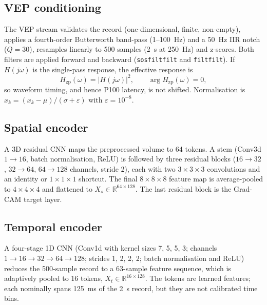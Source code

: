 \documentclass{ieeeaccessapprox}
\begin{document}
\subsection{VEP conditioning}\label{sec:vep}
The VEP stream validates the record (one-dimensional, finite, non-empty), applies a fourth-order Butterworth band-pass (1--100~Hz) and a 50~Hz IIR notch ($Q=30$), resamples linearly to 500 samples (2~s at 250~Hz) and z-scores. Both filters are applied forward and backward (\texttt{sosfiltfilt} and \texttt{filtfilt}). If $H(j\omega)$ is the single-pass response, the effective response is
\begin{equation}
H_{\mathrm{zp}}(\omega)=\lvert H(j\omega)\rvert^{2},\qquad \arg H_{\mathrm{zp}}(\omega)=0,
\label{eq:zp}
\end{equation}
so waveform timing, and hence P100 latency, is not shifted. Normalisation is $\hat{x}_k=(x_k-\mu)/(\sigma+\varepsilon)$ with $\varepsilon=10^{-8}$.

\subsection{Spatial encoder}
A 3D residual CNN maps the preprocessed volume to 64 tokens. A stem (Conv3d $1\!\to\!16$, batch normalisation, ReLU) is followed by three residual blocks ($16\!\to\!32$, $32\!\to\!64$, $64\!\to\!128$ channels, stride 2), each with two $3\!\times\!3\!\times\!3$ convolutions and an identity or $1\!\times\!1\!\times\!1$ shortcut. The final $8\!\times\!8\!\times\!8$ feature map is average-pooled to $4\!\times\!4\!\times\!4$ and flattened to $X_s\in\mathbb{R}^{64\times128}$. The last residual block is the Grad-CAM target layer.

\subsection{Temporal encoder}
A four-stage 1D CNN (Conv1d with kernel sizes 7, 5, 5, 3; channels $1\!\to\!16\!\to\!32\!\to\!64\!\to\!128$; strides 1, 2, 2, 2; batch normalisation and ReLU) reduces the 500-sample record to a 63-sample feature sequence, which is adaptively pooled to 16 tokens, $X_t\in\mathbb{R}^{16\times128}$. The tokens are learned features; each nominally spans 125~ms of the 2~s record, but they are not calibrated time bins.
\end{document}
